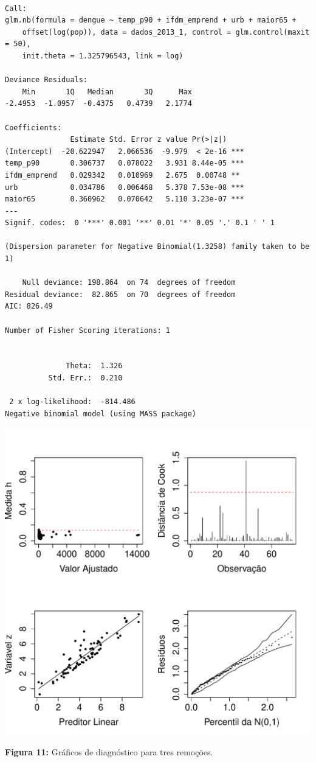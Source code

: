 \documentclass[12pt,a4paper]{article}\usepackage[]{graphicx}\usepackage[]{color}
\makeatletter
\def\maxwidth{ %
  \ifdim\Gin@nat@width>\linewidth
    \linewidth
  \else
    \Gin@nat@width
  \fi
}
\newenvironment{kframe}{%
 \def\at@end@of@kframe{}%
 \ifinner\ifhmode%
  \def\at@end@of@kframe{\end{minipage}}%
  \begin{minipage}{\columnwidth}%
 \fi\fi%
 \def\FrameCommand##1{\hskip\@totalleftmargin \hskip-\fboxsep
 \colorbox{shadecolor}{##1}\hskip-\fboxsep
     \hskip-\linewidth \hskip-\@totalleftmargin \hskip\columnwidth}%
 \MakeFramed {\advance\hsize-\width
   \@totalleftmargin\z@ \linewidth\hsize
   \@setminipage}}%
 {\par\unskip\endMakeFramed%
 \at@end@of@kframe}
\newenvironment{knitrout}{}{} %
\makeatother
\begin{document}
\begin{knitrout}
\color{fgcolor}\begin{kframe}
\begin{verbatim}

Call:
glm.nb(formula = dengue ~ temp_p90 + ifdm_emprend + urb + maior65 + 
    offset(log(pop)), data = dados_2013_1, control = glm.control(maxit = 50), 
    init.theta = 1.325796543, link = log)

Deviance Residuals: 
    Min       1Q   Median       3Q      Max  
-2.4953  -1.0957  -0.4375   0.4739   2.1774  

Coefficients:
               Estimate Std. Error z value Pr(>|z|)    
(Intercept)  -20.622947   2.066536  -9.979  < 2e-16 ***
temp_p90       0.306737   0.078022   3.931 8.44e-05 ***
ifdm_emprend   0.029342   0.010969   2.675  0.00748 ** 
urb            0.034786   0.006468   5.378 7.53e-08 ***
maior65        0.360962   0.070642   5.110 3.23e-07 ***
---
Signif. codes:  0 '***' 0.001 '**' 0.01 '*' 0.05 '.' 0.1 ' ' 1

(Dispersion parameter for Negative Binomial(1.3258) family taken to be 1)

    Null deviance: 198.864  on 74  degrees of freedom
Residual deviance:  82.865  on 70  degrees of freedom
AIC: 826.49

Number of Fisher Scoring iterations: 1


              Theta:  1.326 
          Std. Err.:  0.210 

 2 x log-likelihood:  -814.486 
Negative binomial model (using MASS package) 
\end{verbatim}
\end{kframe}
\includegraphics[width=\maxwidth]{figure/unnamed-chunk-27-1} 

\end{knitrout}
\textbf{Figura 11:} Gráficos de diagnóstico para tres remoções.
\end{document}
